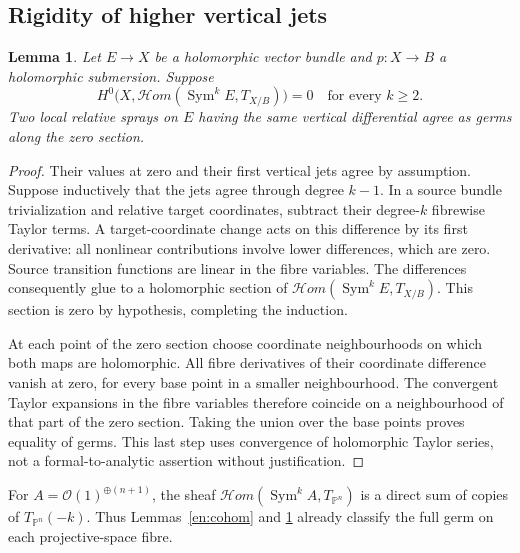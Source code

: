 \documentclass[12pt]{amsart}
\newtheorem{lem}[thm]{Lemma}
\theoremstyle{definition}
\theoremstyle{remark}
\numberwithin{equation}{section}
\newcommand{\Hom}{\mathscr{H}\!\mathit{om}}
\newcommand{\cO}{\mathcal{O}}
\DeclareMathOperator{\Sym}{Sym}
\newcommand{\mP}{\mathbb{P}}
\begin{document}
\subsection{Rigidity of higher vertical jets}
\begin{lem}\label{en:jets}
Let $E\to X$ be a holomorphic vector bundle and $p:X\to B$ a holomorphic submersion. Suppose
\[
H^0\bigl(X,\Hom(\Sym^k E,T_{X/B})\bigr)=0\quad\text{for every }k\geq2.
\]
Two local relative sprays on $E$ having the same vertical differential agree as germs along the zero section.
\end{lem}
\begin{proof}
Their values at zero and their first vertical jets agree by assumption. Suppose inductively that the jets agree through degree $k-1$. In a source bundle trivialization and relative target coordinates, subtract their degree-$k$ fibrewise Taylor terms. A target-coordinate change acts on this difference by its first derivative: all nonlinear contributions involve lower differences, which are zero. Source transition functions are linear in the fibre variables. The differences consequently glue to a holomorphic section of $\Hom(\Sym^k E,T_{X/B})$. This section is zero by hypothesis, completing the induction.

At each point of the zero section choose coordinate neighbourhoods on which both maps are holomorphic. All fibre derivatives of their coordinate difference vanish at zero, for every base point in a smaller neighbourhood. The convergent Taylor expansions in the fibre variables therefore coincide on a neighbourhood of that part of the zero section. Taking the union over the base points proves equality of germs. This last step uses convergence of holomorphic Taylor series, not a formal-to-analytic assertion without justification.
\end{proof}

For $A=\cO(1)^{\oplus(n+1)}$, the sheaf $\Hom(\Sym^k A,T_{\mP^n})$ is a direct sum of copies of $T_{\mP^n}(-k)$. Thus Lemmas~\ref{en:cohom} and \ref{en:jets} already classify the full germ on each projective-space fibre.
\end{document}
